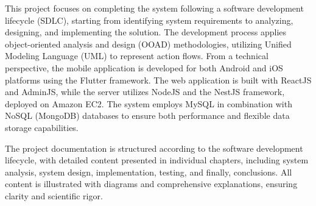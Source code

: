This project focuses on completing the system following a software development lifecycle (SDLC), starting from identifying system requirements to analyzing, designing, and implementing the solution. The development process applies object-oriented analysis and design (OOAD) methodologies, utilizing Unified Modeling Language (UML) to represent action flows. From a technical perspective, the mobile application is developed for both Android and iOS platforms using the Flutter framework. The web application is built with ReactJS and AdminJS, while the server utilizes NodeJS and the NestJS framework, deployed on Amazon EC2. The system employs MySQL in combination with NoSQL (MongoDB) databases to ensure both performance and flexible data storage capabilities.

The project documentation is structured according to the software development lifecycle, with detailed content presented in individual chapters, including system analysis, system design, implementation, testing, and finally, conclusions. All content is illustrated with diagrams and comprehensive explanations, ensuring clarity and scientific rigor.

\cleardoublepage



